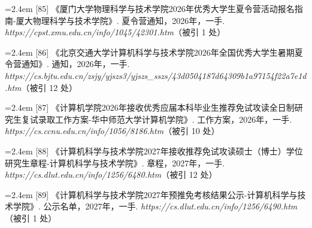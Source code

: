 {\nopagebreak\vspace{1pt}
\noindent\hangindent=2.4em \label{src:S0103}{\color{cAccent}[85]} 《厦门大学物理科学与技术学院2026年优秀大学生夏令营活动报名指南-厦大物理科学与技术学院》. 夏令营通知，2026年，一手. \textit{https://cpst.xmu.edu.cn/info/1045/42301.htm}（被引 1 处）\par
\vspace{0.6pt}
\vspace{3.5pt}\par
\nopagebreak\vspace{1pt}
\noindent\hangindent=2.4em \label{src:S0104}{\color{cAccent}[86]} 《北京交通大学计算机科学与技术学院2026年全国优秀大学生暑期夏令营通知》. 通知，2026年，一手. \textit{https://cs.bjtu.edu.cn/zsjy/yjszs3/yjszs\_sszs/43d0504187d64309b1a97154f22a7e1d.htm}（被引 12 处）\par
\vspace{0.6pt}
\vspace{3.5pt}\par
\nopagebreak\vspace{1pt}
\noindent\hangindent=2.4em \label{src:S0105}{\color{cAccent}[87]} 《计算机学院2026年接收优秀应届本科毕业生推荐免试攻读全日制研究生复试录取工作方案-华中师范大学计算机学院》. 工作方案，2026年，一手. \textit{https://cs.ccnu.edu.cn/info/1056/8186.htm}（被引 10 处）\par
\vspace{0.6pt}
\vspace{3.5pt}\par
\nopagebreak\vspace{1pt}
\noindent\hangindent=2.4em \label{src:S0106}{\color{cAccent}[88]} 《计算机科学与技术学院2027年接收推荐免试攻读硕士（博士）学位研究生章程-计算机科学与技术学院》. 章程，2027年，一手. \textit{https://cs.dlut.edu.cn/info/1256/6480.htm}（被引 12 处）\par
\vspace{0.6pt}
\noindent\hangindent=2.4em \label{src:S0107}{\color{cAccent}[89]} 《计算机科学与技术学院2027年预推免考核结果公示-计算机科学与技术学院》. 公示名单，2027年，一手. \textit{https://cs.dlut.edu.cn/info/1256/6490.htm}（被引 1 处）\par
\vspace{0.6pt}
\vspace{3.5pt}\par
}
